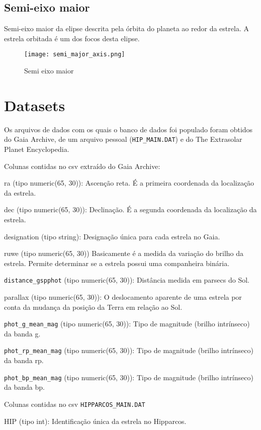 \documentclass[12pt, a4paper]{article}
\begin{document}
	\subsection{Semi-eixo maior}
	Semi-eixo maior da elipse descrita pela órbita do planeta ao redor da estrela. A estrela orbitada é um dos focos desta elipse.

	\begin{figure}[H]
		\centering
		\texttt{[image: semi\_major\_axis.png]}
		\caption{Semi eixo maior}
	\end{figure}

	\section{Datasets}
	
	Os arquivos de dados com os quais o banco de dados foi populado foram obtidos do Gaia Archive, de um arquivo pessoal (\verb|HIP_MAIN.DAT|) e do The Extrasolar Planet Encyclopedia.
	
	Colunas contidas no csv extraído do Gaia Archive:
	
	ra (tipo numeric(65, 30)):
	Ascenção reta. É a primeira coordenada da localização da estrela.
	
	dec (tipo numeric(65, 30)):
	Declinação. É a segunda coordenada da localização da estrela.
	
	designation (tipo string): 
	Designação única para cada estrela no Gaia.
	
	ruwe (tipo numeric(65, 30))
	Basicamente é a medida da variação do brilho da estrela. Permite determinar se a estrela possui uma companheira binária.
	
	\verb|distance_gspphot| (tipo numeric(65, 30)):
	Distância medida em parsecs do Sol.
	
	parallax (tipo numeric(65, 30)):
	O deslocamento aparente de uma estrela por conta da mudança da posição da Terra em relação ao Sol.
	
	\verb|phot_g_mean_mag| (tipo numeric(65, 30)):
	Tipo de magnitude (brilho intrínseco) da banda g.
	
	\verb|phot_rp_mean_mag| (tipo numeric(65, 30)):
	Tipo de magnitude (brilho intrínseco) da banda rp.
	
	\verb|phot_bp_mean_mag| (tipo numeric(65, 30)):
	Tipo de magnitude (brilho intrínseco) da banda bp.
	
	Colunas contidas no csv \verb|HIPPARCOS_MAIN.DAT|
	
	HIP (tipo int):
	Identificação única da estrela no Hipparcos.
	
\end{document}
